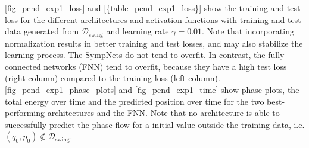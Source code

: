 \documentclass[twoside,a4paper]{article}
\begin{document}
\cref{fig_pend_exp1_loss} and \cref{{table_pend_exp1_loss}} show the training and test loss for the different architectures
and activation functions with training and test data generated from $\mathcal{D}_{\text{swing}}$ and learning rate $\gamma = 0.01$.
Note that incorporating normalization results in better training and test losses, and may also stabilize
the learning process. The SympNets do not tend to overfit.
In contrast, the fully-connected networks (FNN) tend to overfit, because they have a high test loss (right column) 
compared to the training loss (left column).
\cref{fig_pend_exp1_phase_plots} and \cref{fig_pend_exp1_time} show phase plots, the total energy over time
and the predicted position over time for the two best-performing architectures and the FNN.
Note that no architecture is able to successfully predict the phase flow for a initial value outside the training data,
i.e. $(q_0, p_0) \notin \mathcal{D}_{\text{swing}}$.
\end{document}
